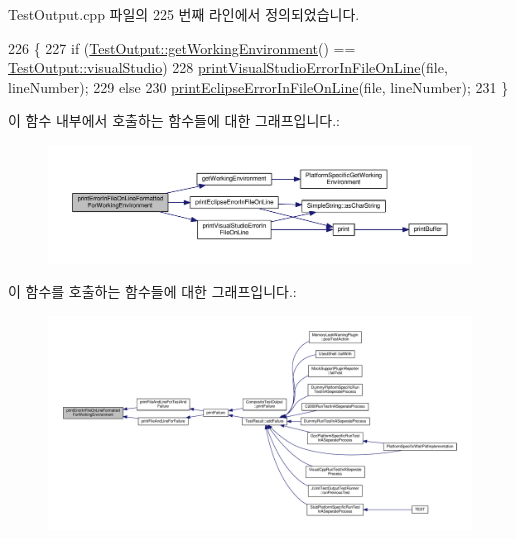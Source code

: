 Test\+Output.\+cpp 파일의 225 번째 라인에서 정의되었습니다.


\begin{DoxyCode}
226 \{
227     \textcolor{keywordflow}{if} (\hyperlink{class_test_output_a90d5028d0f7f6f41ca2dced042a8709d}{TestOutput::getWorkingEnvironment}() == 
      \hyperlink{class_test_output_a0541851f863713454486a9fb3080f766a47f3a5b9ed4237588024b983a4ca8399}{TestOutput::visualStudio})
228         \hyperlink{class_test_output_a0a0136e850e6b9a696ab84e5c416341a}{printVisualStudioErrorInFileOnLine}(file, lineNumber);
229     \textcolor{keywordflow}{else}
230         \hyperlink{class_test_output_aa2b6f28b76a53cac4059991bc3c86f79}{printEclipseErrorInFileOnLine}(file, lineNumber);
231 \}
\end{DoxyCode}


이 함수 내부에서 호출하는 함수들에 대한 그래프입니다.\+:
\nopagebreak
\begin{figure}[H]
\begin{center}
\leavevmode
\includegraphics[width=350pt]{class_test_output_a56ae5964123fc91c7149a8274aa22db9_cgraph}
\end{center}
\end{figure}




이 함수를 호출하는 함수들에 대한 그래프입니다.\+:
\nopagebreak
\begin{figure}[H]
\begin{center}
\leavevmode
\includegraphics[width=350pt]{class_test_output_a56ae5964123fc91c7149a8274aa22db9_icgraph}
\end{center}
\end{figure}


